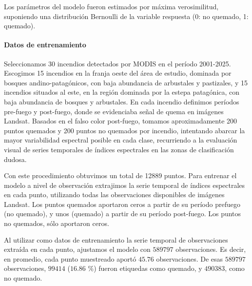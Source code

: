 \documentclass[11pt,a4paper]{article}
\begin{document}
Los parámetros del modelo fueron estimados por máxima verosimilitud, suponiendo una distribución Bernoulli de la variable respuesta (0: no quemado, 1: quemado).

\paragraph{Datos de entrenamiento}\label{sec-prob-obs}

Seleccionamos 30 incendios detectados por MODIS en el período 2001-2025. Escogimos 15 incendios en la franja oeste del área de estudio, dominada por bosques andino-patagónicos, con baja abundancia de arbustales y pastizales, y 15 incendios situados al este, en la región dominada por la estepa patagónica, con baja abundancia de bosques y arbustales. En cada incendio definimos períodos pre-fuego y post-fuego, donde se evidenciaba señal de quema en imágenes Landsat. Basados en el falso color post-fuego, tomamos aproximadamente 200 puntos quemados y 200 puntos no quemados por incendio, intentando abarcar la mayor variabilidad espectral posible en cada clase, recurriendo a la evaluación visual de series temporales de índices espectrales en las zonas de clasificación dudosa.

Con este procedimiento obtuvimos un total de 12889 puntos. Para entrenar el modelo a nivel de observación extrajimos la serie temporal de índices espectrales en cada punto, utilizando todas las observaciones disponibles de imágenes Landsat. Los puntos quemados aportaron ceros a partir de su período prefuego (no quemado), y unos (quemado) a partir de su período post-fuego. Los puntos no quemados, sólo aportaron ceros.

Al utilizar como datos de entrenamiento la serie temporal de observaciones extraída en cada punto, ajustamos el modelo con $589797$ observaciones. Es decir, en promedio, cada punto muestreado aportó $45.76$ observaciones. De esas $589797$ observaciones, $99414$ ($16.86$ \%) fueron etiquedas como quemado, y $490383$, como no quemado. 
\end{document}
